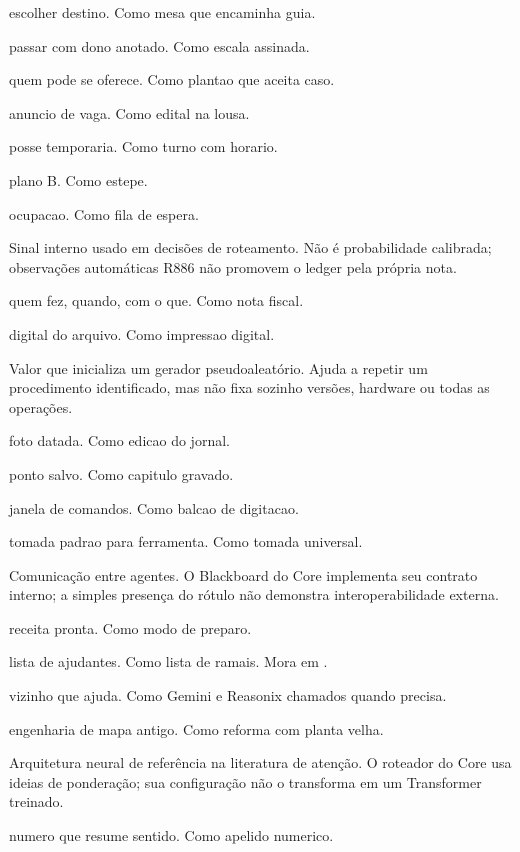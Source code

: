 \begin{descricao}
\begin{description}[style=nextline,leftmargin=1.3em,itemsep=5pt]
\item[Roteamento.] escolher destino. Como mesa que encaminha guia.
\item[Delegação.] passar com dono anotado. Como escala assinada.
\item[Voluntariado.] quem pode se oferece. Como plantao que aceita caso.
\item[CFP.] anuncio de vaga. Como edital na lousa.
\item[Lease.] posse temporaria. Como turno com horario.
\item[Fallback.] plano B. Como estepe.
\item[Carga.] ocupacao. Como fila de espera.
\item[Confiança.] Sinal interno usado em decisões de roteamento. Não é probabilidade calibrada; observações automáticas R886 não promovem o ledger pela própria nota.
\item[Proveniência.] quem fez, quando, com o que. Como nota fiscal.
\item[Hash.] digital do arquivo. Como impressao digital.
\item[Seed.] Valor que inicializa um gerador pseudoaleatório. Ajuda a repetir um procedimento identificado, mas não fixa sozinho versões, hardware ou todas as operações.
\item[Versão.] foto datada. Como edicao do jornal.
\item[Commit.] ponto salvo. Como capitulo gravado.
\item[CLI.] janela de comandos. Como balcao de digitacao.
\item[MCP.] tomada padrao para ferramenta. Como tomada universal.
\item[A2A.] Comunicação entre agentes. O Blackboard do Core implementa seu contrato interno; a simples presença do rótulo não demonstra interoperabilidade externa.
\item[Skill.] receita pronta. Como modo de preparo.
\item[Catálogo.] lista de ajudantes. Como lista de ramais. Mora em .
\item[Executor externo.] vizinho que ajuda. Como Gemini e Reasonix chamados quando precisa.
\item[Reversa.] engenharia de mapa antigo. Como reforma com planta velha.
\item[Transformer.] Arquitetura neural de referência na literatura de atenção. O roteador do Core usa ideias de ponderação; sua configuração não o transforma em um Transformer treinado.
\item[Embedding.] numero que resume sentido. Como apelido numerico.

\end{description}
\end{descricao}
